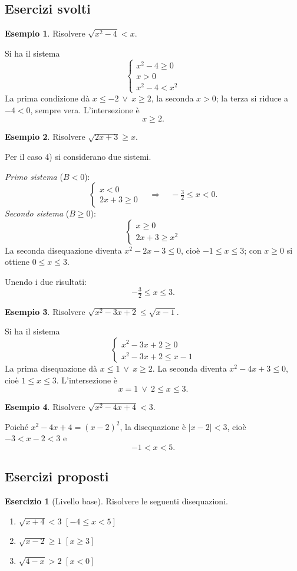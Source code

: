 \documentclass[12pt,a4paper,openany]{book}
\theoremstyle{definition}
\newtheorem{esempio}{Esempio}[section]
\newtheorem{esercizio}{Esercizio}[section]
\theoremstyle{plain}
\theoremstyle{remark}
\newcommand{\abs}[1]{\left|#1\right|}
\newcommand{\sistema}[1]{\begin{cases}#1\end{cases}}
\begin{document}
\subsection*{Esercizi svolti}

\begin{esempio}
Risolvere $\sqrt{x^2-4}<x$.

Si ha il sistema
\[
\sistema{x^2-4\ge 0\\ x>0\\ x^2-4<x^2}
\]
La prima condizione dà $x\le -2\ \lor\ x\ge 2$, la seconda $x>0$; la terza si riduce a $-4<0$, sempre vera. L'intersezione è
\[
x\ge 2.
\]
\end{esempio}

\begin{esempio}
Risolvere $\sqrt{2x+3}\ge x$.

Per il caso 4) si considerano due sistemi.

\emph{Primo sistema} ($B<0$):
\[
\sistema{x<0\\ 2x+3\ge 0}\quad\Longrightarrow\quad -\tfrac32\le x<0.
\]
\emph{Secondo sistema} ($B\ge 0$):
\[
\sistema{x\ge 0\\ 2x+3\ge x^2}
\]
La seconda disequazione diventa $x^2-2x-3\le 0$, cioè $-1\le x\le 3$; con $x\ge 0$ si ottiene $0\le x\le 3$.

Unendo i due risultati:
\[
-\tfrac32\le x\le 3.
\]
\end{esempio}

\begin{esempio}
Risolvere $\sqrt{x^2-3x+2}\le\sqrt{x-1}$.

Si ha il sistema
\[
\sistema{x^2-3x+2\ge 0\\ x^2-3x+2\le x-1}
\]
La prima disequazione dà $x\le 1\ \lor\ x\ge 2$. La seconda diventa $x^2-4x+3\le 0$, cioè $1\le x\le 3$. L'intersezione è
\[
x=1\ \lor\ 2\le x\le 3.
\]
\end{esempio}

\begin{esempio}
Risolvere $\sqrt{x^2-4x+4}<3$.

Poiché $x^2-4x+4=(x-2)^2$, la disequazione è $\abs{x-2}<3$, cioè $-3<x-2<3$ e
\[
-1<x<5.
\]
\end{esempio}

\subsection*{Esercizi proposti}

\begin{esercizio}[Livello base]
Risolvere le seguenti disequazioni.
\begin{enumerate}[label=\alph*)]
\item $\sqrt{x+4}<3$ \hfill $[-4\le x<5]$
\item $\sqrt{x-2}\ge 1$ \hfill $[x\ge 3]$
\item $\sqrt{4-x}>2$ \hfill $[x<0]$
\end{enumerate}
\end{esercizio}
\end{document}
